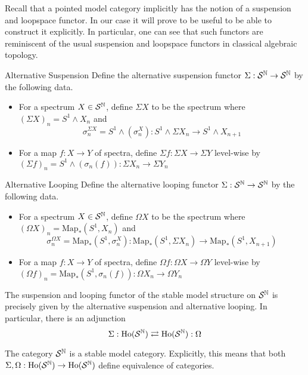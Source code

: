 \documentclass[a4paper]{article}
\begin{document}
Recall that a pointed model category implicitly has the notion of a suspension and loopspace functor. In our case it will prove to be useful to be able to construct it explicitly. In particular, one can see that such functors are reminiscent of the usual suspension and loopspace functors in classical algebraic topology. 

\begin{defn}{Alternative Suspension}{} Define the alternative suspension functor $\Sigma:\mathcal{S}^{\mathbb{N}}\to\mathcal{S}^{\mathbb{N}}$ by the following data. 
\begin{itemize}
\item For a spectrum $X\in\mathcal{S}^{\mathbb{N}}$, define $\Sigma X$ to be the spectrum where $(\Sigma X)_n=S^1\wedge X_n$ and $$\sigma_n^{\Sigma X}=S^1\wedge(\sigma_n^X):S^1\wedge\Sigma X_n\to S^1\wedge X_{n+1}$$
\item For a map $f:X\to Y$ of spectra, define $\Sigma f:\Sigma X\to\Sigma Y$ level-wise by $(\Sigma f)_n=S^1\wedge(\sigma_n(f)):\Sigma X_n\to\Sigma Y_n$
\end{itemize}
\end{defn}

\begin{defn}{Alternative Looping}{} Define the alternative looping functor $\Sigma:\mathcal{S}^{\mathbb{N}}\to\mathcal{S}^{\mathbb{N}}$ by the following data. 
\begin{itemize}
\item For a spectrum $X\in\mathcal{S}^{\mathbb{N}}$, define $\Omega X$ to be the spectrum where $(\Omega X)_n=\text{Map}_\ast(S^1,X_n)$ and $$\sigma_n^{\Omega X}=\text{Map}_\ast(S^1,\sigma_n^X):\text{Map}_\ast(S^1,\Sigma X_n)\to\text{Map}_\ast(S^1,X_{n+1})$$
\item For a map $f:X\to Y$ of spectra, define $\Omega f:\Omega X\to\Omega Y$ level-wise by $(\Omega f)_n=\text{Map}_\ast(S^1,\sigma_n(f)):\Omega X_n\to\Omega Y_n$
\end{itemize}
\end{defn}

\begin{thm}{}{} The suspension and looping functor of the stable model structure on $\mathcal{S}^{\mathbb{N}}$ is precisely given by the alternative suspension and alternative looping. In particular, there is an adjunction $$\Sigma:\text{Ho}(\mathcal{S}^{\mathbb{N}})\rightleftarrows\text{Ho}(\mathcal{S}^{\mathbb{N}}):\Omega$$
\end{thm}

\begin{thm}{}{} The category $\mathcal{S}^{\mathbb{N}}$ is a stable model category. Explicitly, this means that both $\Sigma,\Omega:\text{Ho}(\mathcal{S}^{\mathbb{N}})\to\text{Ho}(\mathcal{S}^{\mathbb{N}})$ define equivalence of categories. 
\end{thm}
\end{document}
